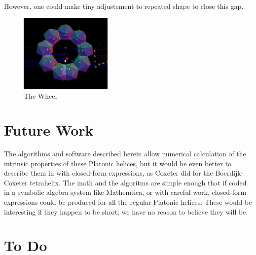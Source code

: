 \documentclass[11pt]{article}
\begin{document}
{\begin{itemize}
  However, one could make tiny adjustement to repeated shape to close this gap.
\begin{figure}
     \centering
     \includegraphics[width=0.40\textwidth]{figures/TheWheel.png}
     \caption{The Wheel}
  \label{fig:thewheel}
\end{figure}
\end{itemize}

\section{Future Work}

The algorithms and software described herein allow numerical calculation of the intrinsic properties of these
Platonic helices, but it would be even better to describe them in with closed-form expressions,
as Coxeter did for the Boerdijk-Coxeter tetrahelix.
The math and the algoritms are simple enough that if coded in a symbolic algebra system like Mathemtica,
or with careful work, closed-form
expressions could be produced for all the regular Platonic helices.
These would be interesting if they happen to be short; we have no reason to
believe they will be.

\section{ To Do}

}
\end{document}
